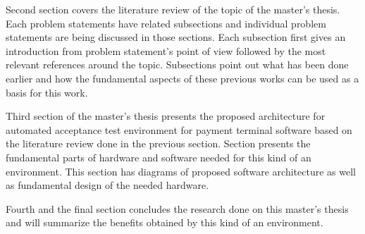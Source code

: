 Second section covers the literature review of the topic of the master's thesis. Each problem statements have related subsections and individual problem statements are being discussed in those sections. Each subsection first gives an introduction from problem statement's point of view followed by the most relevant references around the topic. Subsections point out what has been done earlier and how the fundamental aspects of these previous works can be used as a basis for this work.

Third section of the master's thesis presents the proposed architecture for automated acceptance test environment for payment terminal software based on the literature review done in the previous section. Section presents the fundamental parts of hardware and software needed for this kind of an environment. This section has diagrams of proposed software architecture as well as fundamental design of the needed hardware.

Fourth and the final section concludes the research done on this master's thesis and will summarize the benefits obtained by this kind of an environment.


